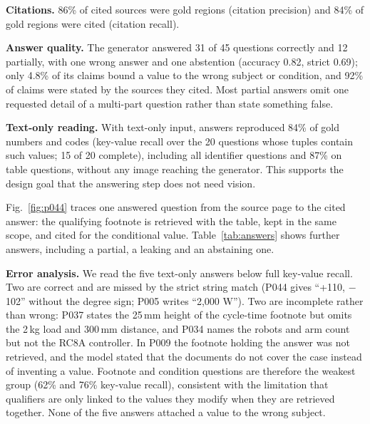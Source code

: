 \documentclass[conference]{IEEEtran}
\begin{document}
\textbf{Citations.} 86\% of cited sources were gold regions (citation precision) and 84\% of gold regions were cited (citation recall).

\textbf{Answer quality.} The generator answered 31 of 45 questions correctly and 12 partially, with one wrong answer and one abstention (accuracy 0.82, strict 0.69); only 4.8\% of its claims bound a value to the wrong subject or condition, and 92\% of claims were stated by the sources they cited. Most partial answers omit one requested detail of a multi-part question rather than state something false.

\textbf{Text-only reading.} With text-only input, answers reproduced 84\% of gold numbers and codes (key-value recall over the 20 questions whose tuples contain such values; 15 of 20 complete), including all identifier questions and 87\% on table questions, without any image reaching the generator. This supports the design goal that the answering step does not need vision.



Fig.~\ref{fig:p044} traces one answered question from the source page to the cited answer: the qualifying footnote is retrieved with the table, kept in the same scope, and cited for the conditional value. Table~\ref{tab:answers} shows further answers, including a partial, a leaking and an abstaining one.

\textbf{Error analysis.}\label{sec:errors} We read the five text-only answers below full key-value recall. Two are correct and are missed by the strict string match (P044 gives ``+110, $-$102'' without the degree sign; P005 writes ``2,000 W''). Two are incomplete rather than wrong: P037 states the 25\,mm height of the cycle-time footnote but omits the 2\,kg load and 300\,mm distance, and P034 names the robots and arm count but not the RC8A controller. In P009 the footnote holding the answer was not retrieved, and the model stated that the documents do not cover the case instead of inventing a value. Footnote and condition questions are therefore the weakest group (62\% and 76\% key-value recall), consistent with the limitation that qualifiers are only linked to the values they modify when they are retrieved together. None of the five answers attached a value to the wrong subject.


\end{document}

